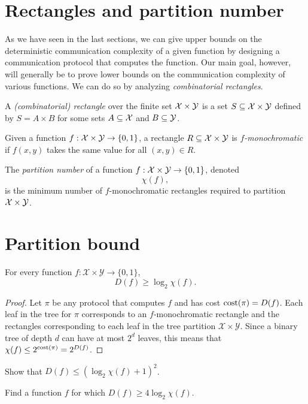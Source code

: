 \newpage \section{Rectangles and partition number}

As we have seen in the last sections, we can give upper bounds on the deterministic communication complexity of a given function by designing a communication protocol that computes the function. Our main goal, however, will generally be to prove lower bounds on the communication complexity of various functions. We can do so by analyzing \emph{combinatorial rectangles}.

\begin{definition}[Rectangle]
A \emph{(combinatorial) rectangle} over the finite set $\mathcal{X} \times \mathcal{Y}$ is a set $S \subseteq \mathcal{X} \times \mathcal{Y}$ defined by $S = A \times B$ for some sets $A \subseteq \mathcal{X}$ and $B \subseteq \mathcal{Y}$.
\end{definition}

\begin{definition}[$f$-monochromatism]
Given a function $f : \mathcal{X} \times \mathcal{Y} \to \{0,1\}$, a rectangle $R \subseteq \mathcal{X} \times \mathcal{Y}$ is \emph{$f$-monochromatic} if $f(x,y)$ takes the same value for all $(x,y) \in R$.
\end{definition}

\begin{definition}[$\chi$]
The \emph{partition number} of a function $f : \mathcal{X} \times \mathcal{Y} \to \{0,1\}$, denoted
\[
\chi(f),
\]
is the minimum number of $f$-monochromatic rectangles required to partition $\mathcal{X} \times \mathcal{Y}$.
\end{definition}


\newpage \section{Partition bound}

\begin{lemma}
For every function $f : \mathcal{X} \times \mathcal{Y} \to \{0,1\}$, 
\[
D(f) \ge \log_2 \chi(f).
\]
\end{lemma}

\begin{proof}
Let $\pi$ be any protocol that computes $f$ and has cost $\mathrm{cost}(\pi) = D(f)$. Each leaf in the tree for $\pi$ corresponds to an $f$-monochromatic rectangle and the rectangles corresponding to each leaf in the tree partition $\mathcal{X} \times \mathcal{Y}$. Since a binary tree of depth $d$ can have at most $2^d$ leaves, this means that $\chi(f) \le 2^{\mathrm{cost}(\pi)} = 2^{D(f)}$. 
\end{proof}

\exercises

\begin{exercise} %
Show that $D(f) \le (\log_2 \chi(f) + 1)^2$.
\end{exercise}

\begin{open}
Find a function $f$ for which $D(f) \ge 4 \log_2 \chi(f)$.
\end{open}

